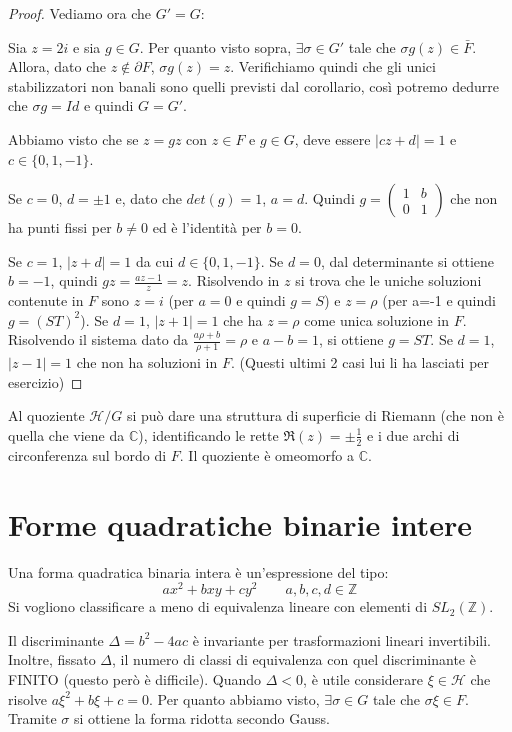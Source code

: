 \begin{proof}
\bigskip
Vediamo ora che $G'=G$:

Sia $z=2i$ e sia $g \in G$. Per quanto visto sopra, $\exists \sigma \in G'$
tale che $\sigma g(z) \in \bar{F}$. Allora, dato che $z \notin \partial F$,
$\sigma g(z)=z$.
Verifichiamo quindi che gli unici stabilizzatori non banali sono quelli
previsti dal corollario, così potremo dedurre che $\sigma g = Id$ e quindi
$G=G'$.

Abbiamo visto che se $z=gz$ con $z \in F$ e $g \in G$, deve essere
$|cz+d|=1$ e $c \in \{ 0,1,-1 \}$.

Se $c=0$, $d=\pm 1$ e, dato che $det(g)=1$, $a=d$. Quindi
$g=\left( \begin{array}{cc} 1 & b \\ 0 & 1 \end{array} \right)$ che non ha
punti fissi per $b\neq 0$ ed è l'identità per $b=0$.

Se $c=1$, $|z+d|=1$ da cui $d \in \{0,1,-1 \}$. Se $d=0$, dal determinante
si ottiene $b=-1$, quindi $gz=\frac{az-1}{z}=z$. Risolvendo in $z$ si trova
che le uniche soluzioni contenute in $F$ sono $z=i$ (per $a=0$ e quindi $g=S$)
e $z=\rho$ (per a=-1 e quindi $g=(ST)^2$).
Se $d=1$, $|z+1|=1$ che ha $z=\rho$ come unica soluzione in $F$. Risolvendo il
sistema dato da $\frac{a \rho +b}{\rho +1}=\rho$ e $a-b=1$, si ottiene $g=ST$.
Se $d=1$, $|z-1|=1$ che non ha soluzioni in $F$.
(Questi ultimi 2 casi lui li ha lasciati per esercizio)
\end{proof}

\begin{osservazione}
Al quoziente $\mathcal{H}/G$ si può dare una struttura di superficie di Riemann
(che non è quella che viene da $\mathbb{C}$),
identificando le rette $\Re(z)=\pm \frac{1}{2}$ e i due archi di circonferenza
sul bordo di $F$. Il quoziente è omeomorfo a $\mathbb{C}$.
\end{osservazione}

\section{Forme quadratiche binarie intere}
Una forma quadratica binaria intera è un'espressione del tipo:
$$ ax^2+bxy+cy^2 \qquad a,b,c,d \in \mathbb{Z} $$
Si vogliono classificare a meno di equivalenza lineare con elementi di
$SL_2 \left( \mathbb{Z} \right)$.

\begin{osservazione}
Il discriminante $\Delta =b^2-4ac$ è invariante per trasformazioni lineari
invertibili. Inoltre, fissato $\Delta$, il numero di classi di equivalenza con
quel discriminante è FINITO (questo però è difficile).
Quando $\Delta < 0$, è utile considerare $\xi \in \mathcal{H}$ che risolve
$a \xi^2 + b \xi + c =0$. Per quanto abbiamo visto, $\exists \sigma \in G$
tale che $\sigma \xi \in F$. Tramite $\sigma$ si ottiene la forma ridotta secondo
Gauss.
\end{osservazione}

